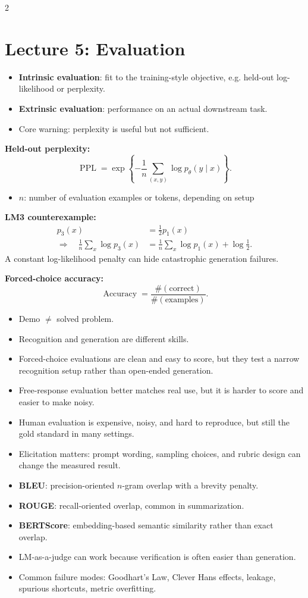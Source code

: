 \documentclass[10pt]{article}
\newcommand{\PPL}{\operatorname{PPL}}
\newenvironment{symdefs}{\begin{itemize}[leftmargin=1.1em, topsep=1pt, itemsep=0pt, parsep=0pt]}{\end{itemize}}
\newcommand{\sym}[2]{\item \textbf{#1}: #2}
\begin{document}
\begin{multicols*}{2}
\section*{Lecture 5: Evaluation}
\begin{itemize}
\item \textbf{Intrinsic evaluation}: fit to the training-style objective, e.g. held-out log-likelihood or perplexity.
\item \textbf{Extrinsic evaluation}: performance on an actual downstream task.
\item Core warning: perplexity is useful but not sufficient.
\end{itemize}

\textbf{Held-out perplexity:}
\[
\PPL
=
\exp\left\{-\frac{1}{n}\sum_{(x,y)} \log p_\theta(y \mid x)\right\}.
\]
\begin{symdefs}
\sym{\(n\)}{number of evaluation examples or tokens, depending on setup}
\end{symdefs}

\textbf{LM3 counterexample:}
\[
\begin{aligned}
p_3(x)&=\frac{1}{2}p_1(x) \\
\Longrightarrow \quad
\frac{1}{n}\sum_x \log p_3(x)
&=
\frac{1}{n}\sum_x \log p_1(x)+\log\frac{1}{2}.
\end{aligned}
\]
A constant log-likelihood penalty can hide catastrophic generation failures.

\textbf{Forced-choice accuracy:}
\[
\operatorname{Accuracy}
=
\frac{\#(\text{correct})}{\#(\text{examples})}.
\]

\begin{itemize}
\item Demo \(\neq\) solved problem.
\item Recognition and generation are different skills.
\item Forced-choice evaluations are clean and easy to score, but they test a narrow recognition setup rather than open-ended generation.
\item Free-response evaluation better matches real use, but it is harder to score and easier to make noisy.
\item Human evaluation is expensive, noisy, and hard to reproduce, but still the gold standard in many settings.
\item Elicitation matters: prompt wording, sampling choices, and rubric design can change the measured result.
\item \textbf{BLEU}: precision-oriented \(n\)-gram overlap with a brevity penalty.
\item \textbf{ROUGE}: recall-oriented overlap, common in summarization.
\item \textbf{BERTScore}: embedding-based semantic similarity rather than exact overlap.
\item LM-as-a-judge can work because verification is often easier than generation.
\item Common failure modes: Goodhart's Law, Clever Hans effects, leakage, spurious shortcuts, metric overfitting.
\end{itemize}


\end{multicols*}
\end{document}
